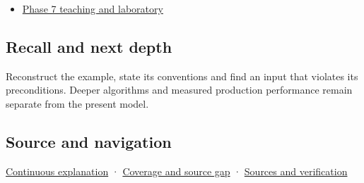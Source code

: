 \hypertarget{appendix-9b4b8254f26b-used-by}{}

\begin{itemize}
\tightlist
\item
  \hyperref[01-foundations-i-ch018-keep-the-promises-visible-while-moving-between-representations]{Phase 7 teaching and laboratory}
\end{itemize}

\subsection{Recall and next depth}\label{appendix-9b4b8254f26b-recall-and-next-depth}

\hypertarget{appendix-9b4b8254f26b-recall-and-next-depth}{}

Reconstruct the example, state its conventions and find an input that violates its preconditions. Deeper algorithms and measured production performance remain separate from the present model.

\subsection{Source and navigation}\label{appendix-9b4b8254f26b-source-and-navigation}

\hypertarget{appendix-9b4b8254f26b-source-and-navigation}{}

\hyperref[01-foundations-i-ch018-keep-the-promises-visible-while-moving-between-representations]{Continuous explanation} · \hyperref[appendix-fd090d982a15-phase-7---parts-601-700]{Coverage and source gap} · \hyperref[appendix-a103e7846d21-phase-7---source-analysis-and-verification]{Sources and verification}
